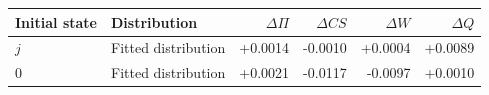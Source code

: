 \begin{tabular}{llrrrr}\toprule
Initial state & Distribution & $\Delta\Pi$ & $\Delta CS$ & $\Delta W$ & $\Delta Q$\\\midrule
$j$ & Fitted distribution & +0.0014 & -0.0010 & +0.0004 & +0.0089 \\
$0$ & Fitted distribution & +0.0021 & -0.0117 & -0.0097 & +0.0010 \\
\bottomrule\end{tabular}
